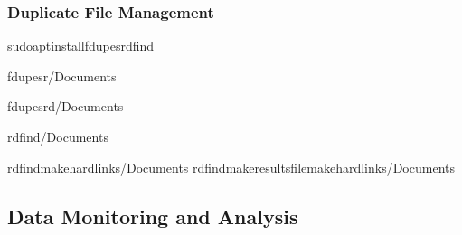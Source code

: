 \documentclass[letterpaper,10pt,english]{sphinxmanual}
\begin{document}
\subsubsection{Duplicate File Management}
\label{\detokenize{data-organization:duplicate-file-management}}
\begin{sphinxVerbatim}[commandchars=\\\{\}]
sudoaptinstallfdupesrdfind

fdupes\PYGZhy{}r\PYGZti{}/Documents

fdupes\PYGZhy{}r\PYGZhy{}d\PYGZti{}/Documents

rdfind\PYGZti{}/Documents

rdfind\PYGZhy{}makehardlinks\PYGZti{}/Documents
rdfind\PYGZhy{}makeresultsfile\PYGZhy{}makehardlinks\PYGZti{}/Documents
\end{sphinxVerbatim}


\subsection{Data Monitoring and Analysis}
\label{\detokenize{data-organization:data-monitoring-and-analysis}}
\end{document}
